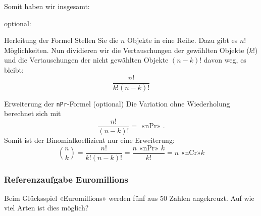 
\noTRAINER{\vspace{2cm}}

  Somit haben wir insgesamt:

optional:

\begin{bemerkung}{Herleitung der Formel}{}
Stellen Sie die $n$ Objekte in eine Reihe. Dazu gibt
es $n!$ Möglichkeiten. Nun dividieren wir die Vertauschungen der
gewählten Objekte ($k!$) und die Vertauschungen der nicht gewählten
Objekte $(n-k)!$ davon weg, es bleibt: $$\frac{n!}{k!(n-k)!}$$
\end{bemerkung}

\begin{bemerkung}{Erweiterung der \texttt{nPr}-Formel (optional)}{}
  Die Variation ohne Wiederholung berechnet sich mit
  $$\frac{n!}{(n-k)!} = \text{ «nPr» }.$$
  Somit ist der Binomialkoeffizient nur eine Erweiterung:
  $${n \choose k} = \frac{n!}{k!(n-k)!} = \frac{n \text{ «nPr» } k}{k!} =
  n \text{ «nCr»} k$$
  \end{bemerkung}
\newpage

\subsubsection{Referenzaufgabe Euromillions}
Beim Glücksspiel «Euromillions» werden fünf aus 50 Zahlen angekreuzt. Auf wie viel Arten ist dies möglich?



